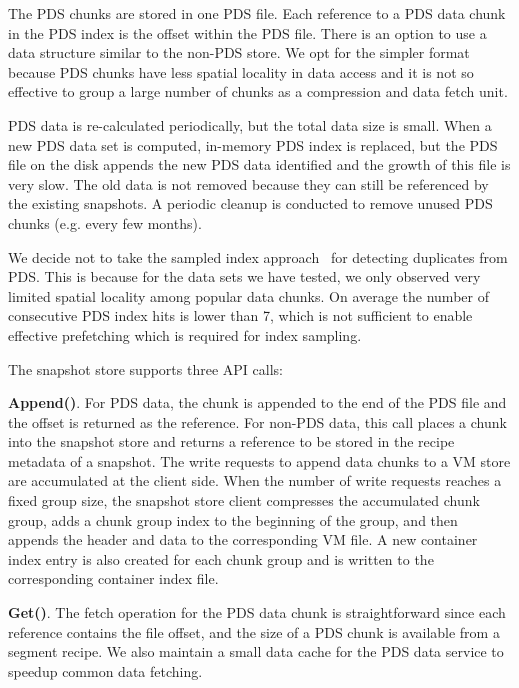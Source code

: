 The PDS chunks are stored in one PDS file. 
Each reference to a PDS data chunk in the PDS index is the offset within the PDS file.
There is an option to use a data structure similar to the non-PDS store. We opt
for the simpler format because
PDS chunks have less spatial locality in data access and it is not so effective
to group a large number of chunks
as a compression and data fetch unit. 

PDS data is re-calculated periodically, but 
the total data size is small.  When
a new PDS data  set is computed, in-memory PDS index is replaced, but 
the PDS file on the disk appends the  new PDS data identified and the growth of this file is very slow. 
The old data is not removed because they can still be referenced by the existing snapshots. 
A periodic cleanup is conducted  to remove unused PDS chunks (e.g. every few months). 

We decide not to take the sampled index approach~\cite{Guo2011} 
for detecting duplicates from PDS.
This is because for the data sets we have tested, we only observed very limited spatial locality 
among popular data chunks. On average the number of consecutive PDS index hits is lower than 7,
which is not sufficient to enable effective prefetching which is required for index sampling.


The snapshot  store supports three API calls:

\noindent\textbf{Append()}. 
For PDS data, the chunk is appended to the end of the PDS file and the offset is returned as the  reference.
For non-PDS data, this call places a chunk into 
the snapshot store and returns a reference to be stored in 
the recipe metadata of a snapshot. 
The write requests to append data chunks to a VM store are accumulated at the client side. 
When the number of write requests reaches a fixed group size, the snapshot store client compresses
the accumulated   chunk group, adds a chunk group index  to the beginning of the group, and then
appends the header and data  to the corresponding VM file.
A new container  index entry is also created for each chunk group and is written to the corresponding
container index file.

\noindent\textbf{Get()}.
The fetch operation for the PDS data chunk is straightforward since each reference contains 
the file offset, and the size of a PDS chunk is available from a segment recipe.
We also maintain a small data cache for the PDS data service to speedup common data fetching.

